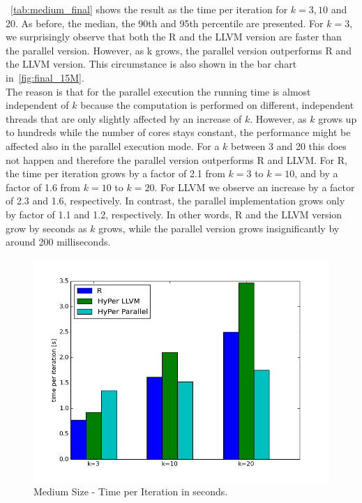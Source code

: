 ~\autoref{tab:medium_final} shows the result as the time per iteration for $k = 3, 10$ and 20. As before, the median, the 90th and 95th percentile are presented. For $k = 3$, we surprisingly observe that both the R and the LLVM version are faster than the parallel version. However, as k grows, the parallel version outperforms R and the LLVM version. This circumstance is also shown in the bar chart in~\autoref{fig:final_15M}.
\\
The reason is that for the parallel execution the running time is almost independent of $k$ because the computation is performed on different, independent threads that are only slightly affected by an increase of $k$. However, as $k$ grows up to hundreds while the number of cores stays constant, the performance might be affected also in the parallel execution mode. For a $k$ between 3 and 20 this does not happen and therefore the parallel version outperforms R and LLVM. For R, the time per iteration grows by a factor of 2.1 from $k = 3$ to $k = 10$, and by a factor of 1.6 from $k = 10$ to $k = 20$. For LLVM we observe an increase by a factor of 2.3 and 1.6, respectively. In contrast, the parallel implementation grows only by factor of 1.1 and 1.2, respectively. In other words, R and the LLVM version grow by seconds as $k$ grows, while the parallel version grows insignificantly by around 200 milliseconds. 

\begin{figure}[htsb]
  \centering
  \includegraphics[scale=0.5, trim="0cm 1.5cm 0cm 0cm"]{figures/charts/final_15M}
  \caption[Medium Size - Time per Iteration]{Medium Size - Time per Iteration in seconds.}
  \label{fig:final_15M}
\end{figure}

